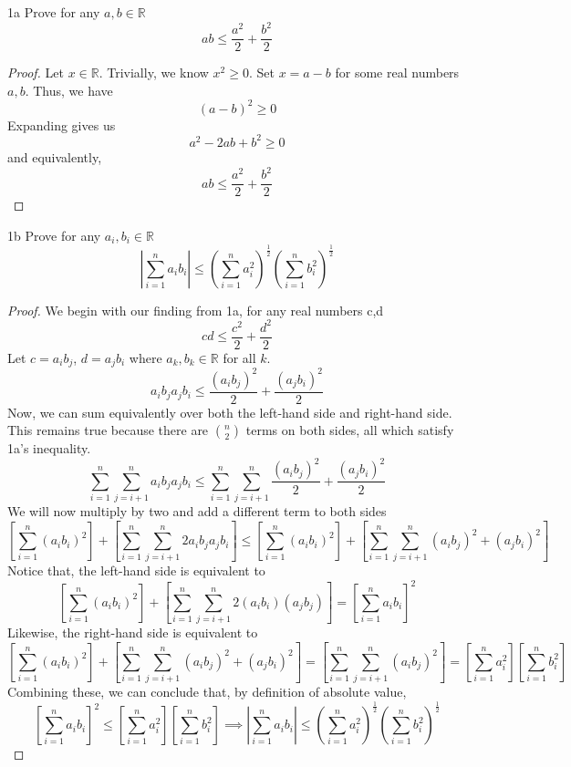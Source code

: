 \documentclass[boxes]{rutgers_hw}
\author{Rohan Karamel}
\date{\today}
\begin{document}
  \maketitle

  \begin{exern}{1a}
    Prove for any $a,b \in \mathbb{R}$
    \[ ab \le \frac{a^2}{2} + \frac{b^2}{2}\]
  \end{exern}
  \begin{proof}
    Let $x \in \mathbb{R}$. Trivially, we know $x^2 \ge 0$.
    Set $x = a - b$ for some real numbers $a, b$. Thus, we have 
    \[ {(a - b)}^2 \ge 0 \]
    Expanding gives us
    \[ a^2 - 2ab + b^2 \ge 0 \]
    and equivalently,
    \[ ab \le \frac{a^2}{2} + \frac{b^2}{2}\]
  \end{proof}

  \pagebreak

  \begin{exern}{1b}
    Prove for any $a_i, b_i \in \mathbb{R}$
    \[ \left|\sum_{i=1}^{n}{a_i b_i}\right| \le {\left(\sum_{i=1}^n{a_i^2}\right)}^\frac12{\left(\sum_{i=1}^n{b_i^2}\right)}^\frac12\]
  \end{exern}
  \begin{proof}
    We begin with our finding from 1a, for any real numbers c,d
    \[ cd \le \frac{c^2}{2} + \frac{d^2}{2}\]
    Let $c = a_i b_j$, $d = a_j b_i$ where $a_k, b_k \in \mathbb{R}$ for all $k$.
    \[ a_i b_j a_j b_i \le \frac{{(a_i b_j)}^2}{2} + \frac{{(a_j b_i)}^2}{2}\]
    Now, we can sum equivalently over both the left-hand side and right-hand side. 
    This remains true because there are $n \choose 2$ terms on both sides, all which satisfy 1a's inequality.
    \[ \sum_{i = 1}^n \sum_{j = i+1}^n a_i b_j a_j b_i \le \sum_{i = 1}^n \sum_{j = i+1}^n \frac{{(a_i b_j)}^2}{2} + \frac{{(a_j b_i)}^2}{2} \]
    We will now multiply by two and add a different term to both sides
    \[ \left[\sum_{i = 1}^n {(a_i b_i)}^2\right] + \left[\sum_{i = 1}^n \sum_{j = i+1}^n 2 a_i b_j a_j b_i \right] \le \left[\sum_{i = 1}^n {(a_i b_i)}^2\right] + \left[\sum_{i = 1}^n \sum_{j = i+1}^n {(a_i b_j)}^2 + {(a_j b_i)}^2 \right]\]
    Notice that, the left-hand side is equivalent to
    \[ \left[\sum_{i = 1}^n {(a_i b_i)}^2\right] + \left[\sum_{i = 1}^n \sum_{j = i+1}^n 2 (a_i b_i) (a_j b_j) \right] = {\left[ \sum_{i=1}^n a_i b_i\right]}^2\]
    Likewise, the right-hand side is equivalent to
    \[ \left[\sum_{i = 1}^n {(a_i b_i)}^2\right] + \left[\sum_{i = 1}^n \sum_{j = i+1}^n {(a_i b_j)}^2 + {(a_j b_i)}^2 \right] = \left[\sum_{i = 1}^n \sum_{j = i + 1}^n{(a_i b_j)}^2\right] = \left[\sum_{i=1}^n a_i^2\right]\left[\sum_{i=1}^n b_i^2\right]\]
    Combining these, we can conclude that, by definition of absolute value,
    \[ {\left[ \sum_{i=1}^n a_i b_i\right]}^2 \le \left[\sum_{i=1}^n a_i^2\right]\left[\sum_{i=1}^n b_i^2\right] \implies \left| \sum_{i=1}^n a_i b_i\right| \le {\left(\sum_{i=1}^n a_i^2\right)}^\frac12{\left(\sum_{i=1}^n b_i^2\right)}^\frac12\]
  \end{proof}
\end{document}
